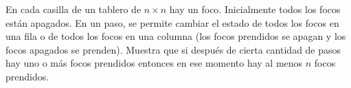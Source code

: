 En cada casilla de un tablero de $n \times n$ hay un foco. Inicialmente todos los focos están
apagados. En un paso, se permite cambiar el estado de todos los focos en una fila o de
todos los focos en una columna (los focos prendidos se apagan y los focos apagados se
prenden).
Muestra que si después de cierta cantidad de pasos hay uno o más focos prendidos entonces
en ese momento hay al menos $n$ focos prendidos.